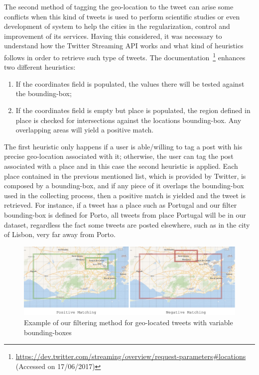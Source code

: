 The second method of tagging the geo-location to the tweet can arise some conflicts when this kind of tweets is used to perform scientific studies or even development of system to help the cities in the regularization, control and improvement of its services. Having this considered, it was necessary to understand how the Twitter Streaming \gls{API} works and what kind of heuristics follows in order to retrieve such type of tweets. The documentation~\footnote{\url{https://dev.twitter.com/streaming/overview/request-parameters\#locations} (Accessed on 17/06/2017)} enhances two different heuristics:

\begin{enumerate}
	\item If the coordinates field is populated, the values there will be tested against the bounding-box;
	\item If the coordinates field is empty but place is populated, the region defined in place is checked for intersections against the locations bounding-box. Any overlapping areas will yield a positive match.
	\end{enumerate}
	
The first heuristic only happens if a user is able/willing to tag a post with his precise geo-location associated with it; otherwise, the user can tag the post associated with a place and in this case the second heuristic is applied. Each place contained in the previous mentioned list, which is provided by Twitter, is composed by a bounding-box, and if any piece of it overlaps the bounding-box used in the collecting process, then a positive match is yielded and the tweet is retrieved. For instance, if a tweet has a place such as Portugal and our filter bounding-box is defined for Porto, all tweets from place Portugal will be in our dataset, regardless the fact some tweets are posted elsewhere, such as in the city of Lisbon, very far away from Porto.

\begin{figure}[!htbp]
	\centering
	\includegraphics[width=\textwidth]{figures/bounding_boxes_matching.pdf}
	\caption{Example of our filtering method for geo-located tweets with variable bounding-boxes}
	\label{fig:matching_example}
\end{figure}

